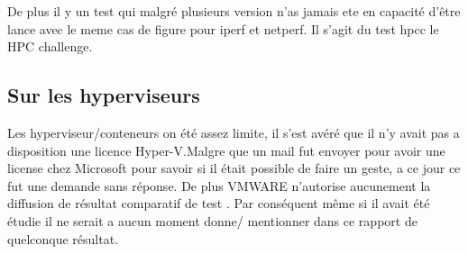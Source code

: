 De plus il y un test qui malgré plusieurs version n'as jamais ete en capacité d’être lance avec le meme cas de figure pour iperf et netperf. Il s'agit du test hpcc le HPC challenge.
\subsection{Sur les hyperviseurs}
Les hyperviseur/conteneurs on été assez limite, il s'est avéré que il n'y avait pas a disposition une licence Hyper-V.Malgre que un mail fut envoyer pour avoir une license chez Microsoft pour savoir si il était possible de faire un geste, a ce jour ce fut une demande sans réponse. De plus VMWARE n'autorise aucunement la diffusion de résultat comparatif de test . Par conséquent même si il avait été étudie il ne serait a aucun moment donne/ mentionner dans ce rapport de quelconque résultat.